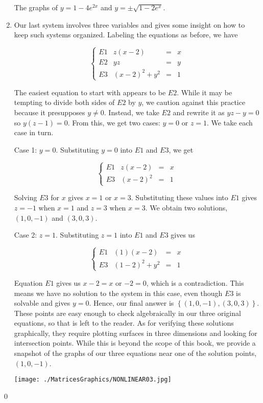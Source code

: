 \begin{ex}
\begin{enumerate}
\begin{center}
\begin{tabular}{cc}
\end{tabular}

The graphs of $y = 1 - 4e^{2x}$ and \boldmath $y = \pm \sqrt{1-2e^{x}}$.

\end{center}

\item  Our last system involves three variables and gives some insight on how to keep such systems organized.  Labeling the equations as before, we have

\[\left\{\begin{array}{lrcl}   E1 & z(x-2) & = & x \\ E2 & yz & = & y \\ E3 & (x-2)^2+y^2 & = & 1 \end{array} \right.\]

The easiest equation to start with appears to be $E2$.  While it may be tempting to divide both sides of $E2$ by $y$, we caution against this practice because it presupposes $y \neq 0$.  Instead, we take $E2$ and rewrite it as $yz-y = 0$ so $y(z-1) = 0$.  From this, we get two cases:  $y = 0$ or $z = 1$.  We take each case in turn.

{ \sc Case 1: $y = 0$. }  Substituting $y=0$ into $E1$ and $E3$, we get 

\[\left\{\begin{array}{lrcl}   E1 & z(x-2) & = & x \\ E3 & (x-2)^2 & = & 1 \end{array} \right.\]

Solving $E3$ for $x$ gives $x = 1$ or $x=3$.  Substituting these values into $E1$ gives $z=-1$ when $x=1$ and $z = 3$ when $x=3$.  We obtain two solutions, $(1,0,-1)$ and $(3,0,3)$.

{ \sc Case 2:  $z = 1$. }  Substituting $z=1$ into $E1$ and $E3$ gives us 


\[\left\{\begin{array}{lrcl}   E1 & (1)(x-2) & = & x  \\ E3 & (1-2)^2+y^2 & = & 1 \end{array} \right.\]

Equation $E1$ gives us $x-2 = x$ or $-2 = 0$, which is a contradiction.  This means we have no solution to the system in this case, even though $E3$ is solvable and gives $y=0$.  Hence, our final answer is $\left\{ (1,0,-1), (3,0,3) \right\}$.  These points are easy enough to check algebraically in our three original equations, so that is left to the reader.  As for verifying these solutions graphically, they require plotting surfaces in three dimensions and looking for intersection points.  While this is beyond the scope of this book, we provide a snapshot of the graphs of our three equations near one of the solution points,  $(1,0,-1)$.

\centerline{\texttt{[image: ./MatricesGraphics/NONLINEAR03.jpg]}}

\end{enumerate}

\qed

\end{ex}

